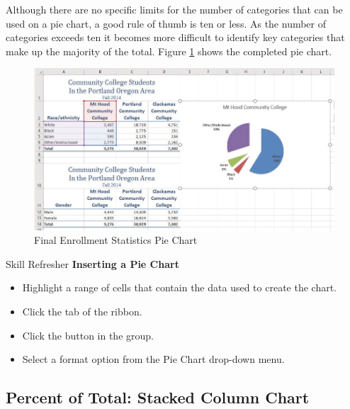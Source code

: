 Although there are no specific limits for the number of categories that can be used on a pie chart, a good rule of thumb is ten or less. As the number of  categories exceeds ten it becomes more difficult to identify key categories that make up the majority of the total. Figure \ref{04:fig22} shows the completed pie chart.

\begin{figure}[H]
	\centering
	\includegraphics[width=\maxwidth{.95\linewidth}]{gfx/ch04_fig22}
	\caption{Final Enrollment Statistics Pie Chart}
	\label{04:fig22}
\end{figure}

\begin{center}
	\begin{sklbox}{Skill Refresher}
		\textbf{Inserting a Pie Chart}
		\\
		\begin{itemize}
			\setlength{\itemsep}{0pt}
			\setlength{\parskip}{0pt}
			\setlength{\parsep}{0pt}

			\item Highlight a range of cells that contain the data used to create the chart.
			\item Click the  tab of the ribbon.
			\item Click the  button in the  group.
			\item Select a format option from the Pie Chart drop-down menu.
			
		\end{itemize}
	\end{sklbox}
\end{center}

\subsection{Percent of Total: Stacked Column Chart}

